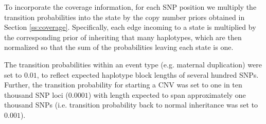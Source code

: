 To incorporate the coverage information, for each SNP position we multiply the transition probabilities into the state by the copy number priors obtained in Section \ref{ss:coverage}. Specifically, each edge incoming to a state is multiplied by the corresponding prior of inheriting that many haplotypes, which are then normalized so that the sum of the probabilities leaving each state is one. %

The transition probabilities within an event type (e.g. maternal duplication) were set to $0.01$, to reflect expected haplotype block lengths of several hundred SNPs. Further, the transition probability for starting a CNV was set to one in ten thousand SNP loci ($0.0001$) with length expected to span approximately one thousand SNPs (i.e. transition probability back to normal inheritance was set to $0.001$).

